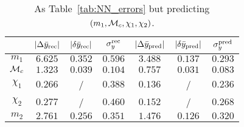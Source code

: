 \begin{table}
  \caption{\label{tab:NN_errors_temp} As Table~\ref{tab:NN_errors} but predicting $(m_1, {\cal{M}}_c, \chi_1, \chi_2)$. }
  \begin{center}
  \begin{tabular}{c|ccc|ccc}
  \hline\hline
  & $|\Delta \bar{y}_{\rm rec}|$  & $|\delta \bar{y}_{\rm rec}|$  & $\sigma_y^{\rm rec}$ & 
     $|\Delta \bar{y}_{\rm pred}|$ & $|\delta \bar{y}_{\rm pred}|$ & $\sigma_y^{\rm pred}$ \\
  \hline\hline
$m_1$          & $6.625$ & $0.352$ & $0.596$ & $3.488$ & $0.137$ & $0.293$ \\
${\cal{M}}_c$  & $1.323$ & $0.039$ & $0.104$ & $0.757$ & $0.031$ & $0.083$ \\
$\chi_1$       & $0.266$ &  /  & $0.388$ & $0.136$ &  /  & $0.236$ \\
$\chi_2$       & $0.277$ &  /  & $0.460$ & $0.152$ &  /  & $0.268$ \\
\hline
$m_2$          & $2.761$ & $0.256$ & $0.351$ & $1.476$ & $0.126$ & $0.320$ \\
  \hline\hline
\end{tabular}
\end{center}
\end{table}